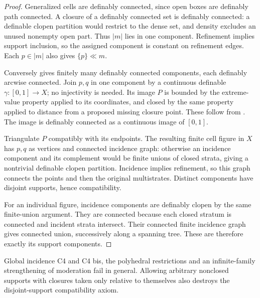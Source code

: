 \begin{proof}
Generalized cells are definably connected,
since open boxes are definably path
connected. A closure of a definably
connected set is definably connected:
a definable clopen partition would
restrict to the dense set, and
density excludes an unused nonempty
open part. Thus \(|m|\) lies in
one component. Refinement implies
support inclusion, so the assigned
component is constant on refinement
edges. Each \(p\in|m|\) also
gives \(\{p\}\ll m\).

Conversely
\citet[Theorem 3.9, p.~28]{Coste1999}
gives finitely many definably
connected components, each definably
arcwise connected. Join \(p,q\)
in one component by a continuous
definable \(\gamma:[0,1]\to X\);
no injectivity is needed.
Its image \(P\) is bounded by
the extreme-value property
applied to its coordinates,
and closed by the same property
applied to distance from a
proposed missing closure point.
These follow from
\citet[Theorem 3.4, pp.~26--27]{Coste1999}.
The image is definably connected
as a continuous image of \([0,1]\).

Triangulate \(P\) compatibly
with its endpoints. The
resulting finite cell figure
in \(X\) has \(p,q\) as
vertices and connected
incidence graph: otherwise
an incidence component
and its complement would
be finite unions of closed
strata, giving a nontrivial
definable clopen partition.
Incidence implies refinement,
so this graph connects the
points and then the original
multistrates. Distinct
components have disjoint
supports, hence compatibility.

For an individual figure,
incidence components are
definably clopen by the
same finite-union argument.
They are connected because
each closed stratum is
connected and incident
strata intersect. Their
connected finite incidence
graph gives connected union,
successively along a spanning
tree. These are therefore
exactly its support components.
\end{proof}

\begin{proposition}\label{SA21-BM-cell-limits}
Global incidence C4 and C4 bis, the polyhedral
restrictions and an infinite-family strengthening
of moderation fail in general. Allowing arbitrary
nonclosed supports with closures taken only
relative to themselves also destroys the
disjoint-support compatibility axiom.
\end{proposition}

